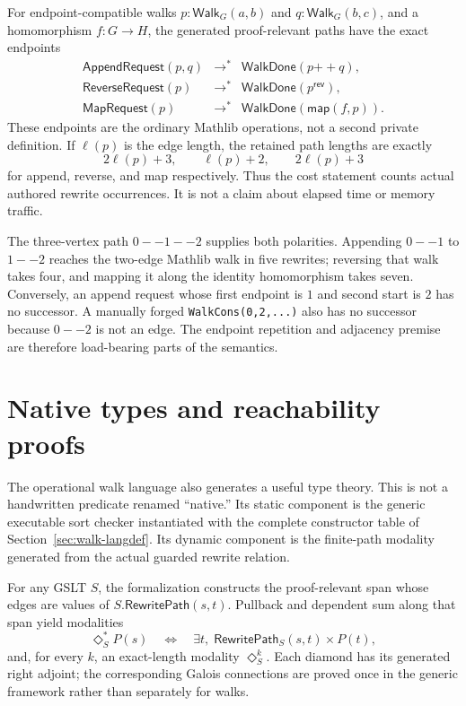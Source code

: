 \documentclass[11pt]{article}
\theoremstyle{remark}
\newcommand{\code}[1]{\texttt{#1}}
\newcommand{\Step}{\mathrel{\longrightarrow}}
\begin{document}
For endpoint-compatible walks \(p : \mathsf{Walk}_G(a,b)\) and
\(q : \mathsf{Walk}_G(b,c)\), and a homomorphism \(f:G\to H\), the generated
proof-relevant paths have the exact endpoints
\[
\begin{array}{rcl}
  \mathsf{AppendRequest}(p,q) &\Step^*&
    \mathsf{WalkDone}(p\mathbin{++}q),\\
  \mathsf{ReverseRequest}(p) &\Step^*&
    \mathsf{WalkDone}(p^{\mathsf{rev}}),\\
  \mathsf{MapRequest}(p) &\Step^*&
    \mathsf{WalkDone}(\mathsf{map}(f,p)).
\end{array}
\]
These endpoints are the ordinary Mathlib operations, not a second private
definition.  If \(\ell(p)\) is the edge length, the retained path lengths are
exactly
\[
  2\ell(p)+3,\qquad \ell(p)+2,\qquad 2\ell(p)+3
\]
for append, reverse, and map respectively.  Thus the cost statement counts
actual authored rewrite occurrences.  It is not a claim about elapsed time or
memory traffic.

The three-vertex path \(0--1--2\) supplies both polarities.  Appending
\(0--1\) to \(1--2\) reaches the two-edge Mathlib walk in five rewrites;
reversing that walk takes four, and mapping it along the identity homomorphism
takes seven.  Conversely, an append request whose first endpoint is \(1\) and
second start is \(2\) has no successor.  A manually forged
\code{WalkCons(0,2,...)} also has no successor because \(0--2\) is not an
edge.  The endpoint repetition and adjacency premise are therefore
load-bearing parts of the semantics.

\section{Native types and reachability proofs}
\label{sec:walk-ntt}

The operational walk language also generates a useful type theory.  This is
not a handwritten predicate renamed ``native.''  Its static component is the
generic executable sort checker instantiated with the complete constructor
table of Section~\ref{sec:walk-langdef}.  Its dynamic component is the
finite-path modality generated from the actual guarded rewrite relation.

For any GSLT \(S\), the formalization constructs the proof-relevant span whose
edges are values of \(S.\mathsf{RewritePath}(s,t)\).  Pullback and dependent
sum along that span yield modalities
\[
  \Diamond^*_{S}P(s)
    \quad\Longleftrightarrow\quad
  \exists t,\;\mathsf{RewritePath}_{S}(s,t)\times P(t),
\]
and, for every \(k\), an exact-length modality \(\Diamond^{k}_{S}\).
Each diamond has its generated right adjoint; the corresponding Galois
connections are proved once in the generic framework rather than separately
for walks.
\end{document}
